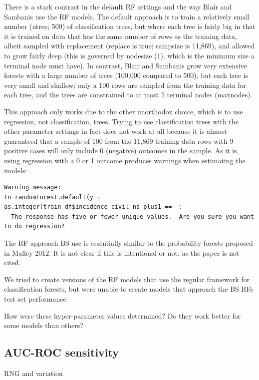 \documentclass[]{article}
\begin{document}
There is a stark contrast in the default RF settings and the way Blair
and Sambanis use the RF models. The default approach is to train a
relatively small number (ntree; 500) of classification trees, but where
each tree is fairly big in that it is trained on data that has the same
number of rows as the training data, albeit sampled with replacement
(replace is true; sampsize is 11,869), and allowed to grow fairly deep
(this is governed by nodesize (1), which is the minimum size a terminal
node must have). In contrast, Blair and Sambanis grow very extensive
forests with a large number of trees (100,000 compared to 500), but each
tree is very small and shallow; only a 100 rows are sampled from the
training data for each tree, and the trees are constrained to at most 5
terminal nodes (maxnodes).

This approach only works due to the other unorthodox choice, which is to
use regression, not classification, trees. Trying to use classification
trees with the other parameter settings in fact does not work at all
because it is almost guaranteed that a sample of 100 from the 11,869
training data rows with 9 positive cases will only include 0 (negative)
outcomes in the sample. As it is, using regression with a 0 or 1 outcome
produces warnings when estimating the models:

\begin{verbatim}
Warning message:
In randomForest.default(y = as.integer(train_df$incidence_civil_ns_plus1 ==  :
  The response has five or fewer unique values.  Are you sure you want to do regression?
\end{verbatim}

The RF approach BS use is essentially similar to the probability forests
proposed in Malley 2012. It is not clear if this is intentional or not,
as the paper is not cited.

We tried to create versions of the RF models that use the regular
framework for classification forests, but were unable to create models
that approach the BS RFs test set performance.

How were these hyper-parameter values determined? Do they work better
for some models than others?

\hypertarget{auc-roc-sensitivity}{%
\subsection{AUC-ROC sensitivity}\label{auc-roc-sensitivity}}

RNG and variation
\end{document}
